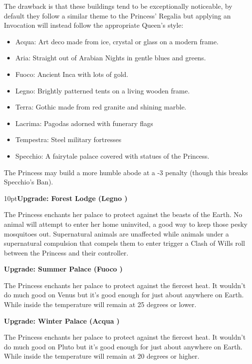 The drawback is that these buildings tend to be exceptionally noticeable, by default they follow a similar theme to the Princess' Regalia but applying an Invocation will instead follow the appropriate Queen's style:

\begin{itemize}
 \item Acqua: Art deco made from ice, crystal or glass on a modern frame.
 \item Aria: Straight out of Arabian Nights in gentle blues and greens.
 \item Fuoco: Ancient Inca with lots of gold.
 \item Legno: Brightly patterned tents on a living wooden frame.
 \item Terra: Gothic made from red granite and shining marble.
 \item Lacrima: Pagodas adorned with funerary flags
 \item Tempestra: Steel military fortresses
 \item Specchio: A fairytale palace covered with statues of the Princess.\end{itemize}

The Princess may build a more humble abode at a -3 penalty (though this breaks Specchio's Ban).

\begin{myindentpar}{10pt}\textbf{Upgrade: Forest Lodge (Legno \textbullet)}

The Princess enchants her palace to protect against the beasts of the Earth. No animal will attempt to enter her home uninvited, a good way to keep those pesky mosquitoes out. Supernatural animals are unaffected while animals under a supernatural compulsion that compels them to enter trigger a Clash of Wills roll between the Princess and their controller. 

\textbf{Upgrade: Summer Palace (Fuoco \textbullet\textbullet)}

The Princess enchants her palace to protect against the fiercest heat. It wouldn't do much good on Venus but it's good enough for just about anywhere on Earth. While inside the temperature will remain at 25 degrees or lower.

\textbf{Upgrade: Winter Palace (Acqua \textbullet\textbullet)}

The Princess enchants her palace to protect against the fiercest heat. It wouldn't do much good on Pluto but it's good enough for just about anywhere on Earth. While inside the temperature will remain at 20 degrees or higher. 

\end{myindentpar}

